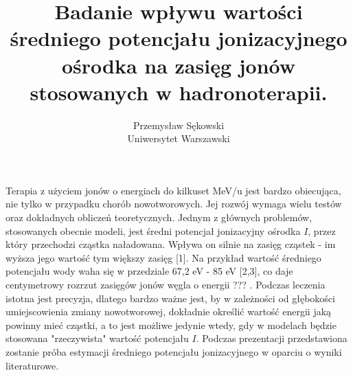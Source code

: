 \documentclass[12pt, a4paper]{article}
\begin{document}
\title{Badanie wpływu wartości średniego potencjału jonizacyjnego ośrodka na zasięg jonów stosowanych w hadronoterapii.}
\author{Przemysław Sękowski \\ Uniwersytet Warszawski}
\date {}
\maketitle
\thispagestyle{title}

Terapia z użyciem jonów o energiach do kilkuset MeV/u jest bardzo obiecująca, nie tylko w przypadku chorób nowotworowych.  Jej rozwój wymaga wielu testów oraz dokładnych obliczeń teoretycznych. Jednym z głównych problemów, stosowanych obecnie modeli,  jest średni potencjał jonizacyjny ośrodka $I$, przez który przechodzi cząstka naładowana. Wpływa on silnie na zasięg cząstek - im wyższa jego wartość tym większy zasięg [1]. Na przykład wartość średniego potencjału wody waha się w przedziale 67,2 eV - 85 eV [2,3], co daje centymetrowy rozrzut zasięgów jonów węgla o energii ??? . Podczas leczenia istotna jest precyzja, dlatego bardzo ważne jest, by w zależności od głębokości umiejscowienia zmiany nowotworowej, dokładnie określić wartość energii jaką powinny mieć cząstki, a to jest możliwe jedynie wtedy, gdy w modelach będzie stosowana "rzeczywista" wartość potencjału $I$. 
Podczas prezentacji przedstawiona zostanie próba estymacji średniego potencjału jonizacyjnego w oparciu o  wyniki literaturowe.
\end{document}
